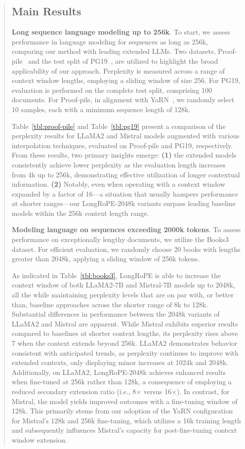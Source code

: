 \begin{abstract}
\subsection{Main Results}

\label{sec:mainresult}
\textbf{Long sequence language modeling up to 256k}. To start, we assess performance in language modeling for sequences as long as 256k, comparing our method with leading extended LLMs. Two datasets, Proof-pile~\cite{pg19} and the test split of PG19~\cite{pile}, are utilized to highlight the broad applicability of our approach. Perplexity is measured across a range of context window lengths, employing a sliding window of size 256. For PG19, evaluation is performed on the complete test split, comprising 100 documents. For Proof-pile, in alignment with YaRN~\cite{yarn}, we randomly select 10 samples, each with a minimum sequence length of 128k.

Table~\ref{tbl:proof-pile} and Table~\ref{tbl:pg19} present a comparison of the perplexity results for LLaMA2 and Mistral models augmented with various interpolation techniques, evaluated on Proof-pile and PG19, respectively. From these results, two primary insights emerge: \textbf{(1)} the extended models consistently achieve lower perplexity as the evaluation length increases from 4k up to 256k, demonstrating effective utilization of longer contextual information. \textbf{(2)} Notably, even when operating with a context window expanded by a factor of 16—a situation that usually hampers performance at shorter ranges—our LongRoPE-2048k variants surpass leading baseline models within the 256k context length range.

\textbf{Modeling language on sequences exceeding 2000k tokens}. To assess performance on exceptionally lengthy documents, we utilize the Books3~\cite{pile} dataset. For efficient evaluation, we randomly choose 20 books with lengths greater than 2048k, applying a sliding window of 256k tokens.

As indicated in Table~\ref{tbl:books3}, LongRoPE is able to increase the context window of both LLaMA2-7B and Mistral-7B models up to 2048k, all the while maintaining perplexity levels that are on par with, or better than, baseline approaches across the shorter range of 8k to 128k. Substantial differences in performance between the 2048k variants of LLaMA2 and Mistral are apparent. While Mistral exhibits superior results compared to baselines at shorter context lengths, its perplexity rises above 7 when the context extends beyond 256k. LLaMA2 demonstrates behavior consistent with anticipated trends, as perplexity continues to improve with extended contexts, only displaying minor increases at 1024k and 2048k. Additionally, on LLaMA2, LongRoPE-2048k achieves enhanced results when fine-tuned at 256k rather than 128k, a consequence of employing a reduced secondary extension ratio (i.e., 8$\times$ versus 16$\times$). In contrast, for Mistral, the model yields improved outcomes with a fine-tuning window of 128k. This primarily stems from our adoption of the YaRN configuration for Mistral's 128k and 256k fine-tuning, which utilizes a 16k training length and subsequently influences Mistral's capacity for post-fine-tuning context window extension.


\end{abstract}
